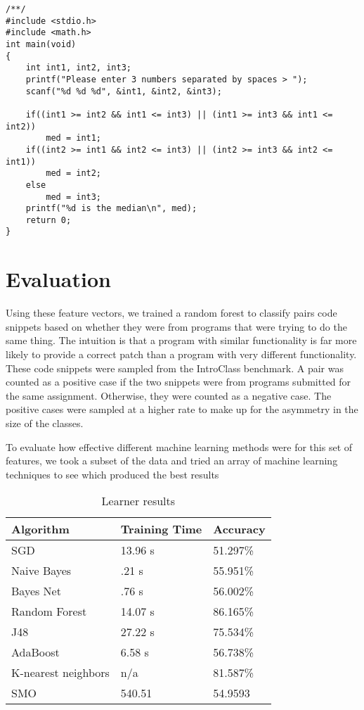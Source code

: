 \documentclass[conference]{IEEEtran}
\begin{document}
\begin{lstlisting}
/**/
#include <stdio.h>
#include <math.h>
int main(void)
{
	int int1, int2, int3; 
	printf("Please enter 3 numbers separated by spaces > ");
	scanf("%d %d %d", &int1, &int2, &int3);

	if((int1 >= int2 && int1 <= int3) || (int1 >= int3 && int1 <= int2))
		med = int1;
    if((int2 >= int1 && int2 <= int3) || (int2 >= int3 && int2 <= int1))
        med = int2;
    else
        med = int3;
    printf("%d is the median\n", med);
	return 0;
}                                             
\end{lstlisting}

\section{Evaluation}

Using these feature vectors, we trained a random forest to classify pairs code snippets based on whether they were from programs that were trying to do the same thing. 
The intuition is that a program with similar functionality is far more likely to provide a correct patch than a program with very different functionality. 
These code snippets were sampled from the IntroClass benchmark. 
A pair was counted as a positive case if the two snippets were from programs submitted for the same assignment. 
Otherwise, they were counted as a negative case. 
The positive cases were sampled at a higher rate to make up for the asymmetry in the size of the classes. 

To evaluate how effective different machine learning methods were for this set of features, we took a subset of the data and tried an array of machine learning techniques to see which produced the best results

\begin{table}[H]
\centering
\caption{Learner results}
\label{}
\begin{tabular}{lll}
\hline \hline
Algorithm & Training Time & Accuracy \\
\hline
SGD                 & 13.96 s 	& 51.297\% \\
Naive Bayes         & .21 s   	& 55.951\% \\
Bayes Net           & .76 s   	& 56.002\% \\
Random Forest       & 14.07 s 	& 86.165\% \\
J48                 & 27.22 s 	& 75.534\% \\
AdaBoost            & 6.58 s  	& 56.738\% \\
K-nearest neighbors & n/a    	& 81.587\% \\
SMO					& 540.51	& 54.9593
\end{tabular}
\end{table}
\end{document}
